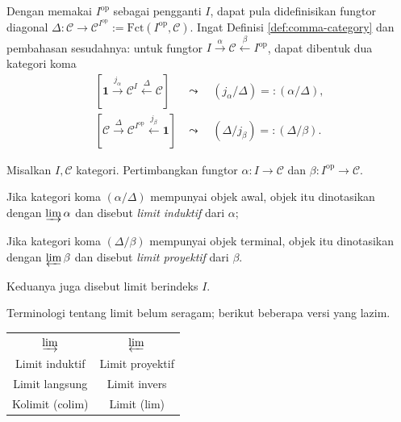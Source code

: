 Dengan memakai $I^{\text{op}}$ sebagai pengganti $I$, dapat pula didefinisikan fungtor diagonal $\Delta: \mathcal{C} \to \mathcal{C}^{I^{\text{op}}} := \text{Fct}(I^{\text{op}}, \mathcal{C})$. Ingat Definisi \ref{def:comma-category} dan pembahasan sesudahnya: untuk fungtor $I \xrightarrow{\alpha} \mathcal{C} \xleftarrow{\beta} I^\text{op}$, dapat dibentuk dua kategori koma
\begin{align*}
	\left[ \mathbf{1} \xrightarrow{j_\alpha} \mathcal{C}^I \xleftarrow{\Delta} \mathcal{C} \right] & \leadsto \quad (j_\alpha/\Delta) =: (\alpha / \Delta), \\
	\left[ \mathcal{C} \xrightarrow{\Delta} \mathcal{C}^{I^\text{op}} \xleftarrow{j_\beta} \mathbf{1} \right] & \leadsto \quad (\Delta/j_\beta) =: (\Delta/\beta).
\end{align*}
\begin{definition}[Limit]\label{def:limit}
	Misalkan $I, \mathcal{C}$ kategori. Pertimbangkan fungtor $\alpha: I \to \mathcal{C}$ dan $\beta: I^\text{op} \to \mathcal{C}$.
	\begin{compactenum}
		\item Jika kategori koma $(\alpha / \Delta)$ mempunyai objek awal, objek itu dinotasikan dengan $\varinjlim \alpha$ dan disebut \emph{limit induktif} dari $\alpha$;
		\item Jika kategori koma $(\Delta / \beta)$ mempunyai objek terminal, objek itu dinotasikan dengan $\varprojlim \beta$ dan disebut \emph{limit proyektif} dari $\beta$.
	\end{compactenum}
	Keduanya juga disebut limit berindeks $I$.
\end{definition}
Terminologi tentang limit belum seragam; berikut beberapa versi yang lazim.
\begin{center}\begin{tabular}{c|c}
	$\varinjlim$ & $\varprojlim$ \\
	Limit induktif & Limit proyektif \\
	Limit langsung & Limit invers \\
	Kolimit ($\text{colim}$) & Limit ($\text{lim}$)
\end{tabular}\end{center}

